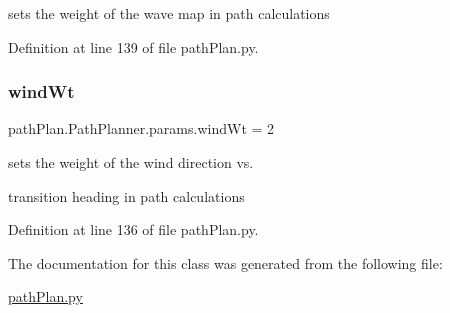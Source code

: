 sets the weight of the wave map in path calculations 



Definition at line 139 of file path\+Plan.\+py.

\mbox{\label{classpath_plan_1_1_path_planner_1_1params_a0aafe9db7a80b4f22c7e2ad577b8daff}} 
\subsubsection{\texorpdfstring{wind\+Wt}{windWt}}
{\footnotesize\ttfamily path\+Plan.\+Path\+Planner.\+params.\+wind\+Wt = 2\hspace{0.3cm}{\ttfamily [static]}}



sets the weight of the wind direction vs. 

transition heading in path calculations 

Definition at line 136 of file path\+Plan.\+py.



The documentation for this class was generated from the following file\+:\begin{DoxyCompactItemize}
\item 
\mbox{\hyperlink{path_plan_8py}{path\+Plan.\+py}}\end{DoxyCompactItemize}
